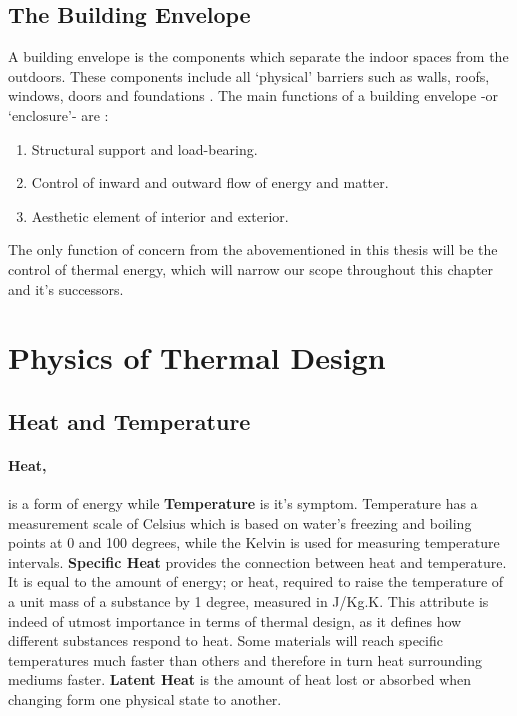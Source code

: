 \subsection{The Building Envelope}
A building envelope is the components which separate the indoor spaces from the outdoors. These components include all `physical' barriers such as walls, roofs, windows, doors and foundations \cite{HPO}. The main functions of a building envelope -or `enclosure'- are \cite{straube05}:
\begin{enumerate}
  \item Structural support and load-bearing.
  \item Control of inward and outward flow of energy and matter.
  \item Aesthetic element of interior and exterior.
\end{enumerate}
The only function of concern from the abovementioned in this thesis will be the control of thermal energy, which will narrow our scope throughout this chapter and it's successors.

\section{Physics of Thermal Design}

\subsection{Heat and Temperature}
\paragraph{Heat,}is a form of energy while \textbf{Temperature} is it's symptom. Temperature has a measurement scale of Celsius which is based on water's freezing and boiling points at 0 and 100 degrees, while the Kelvin is used for measuring temperature intervals. \textbf{Specific Heat} provides the connection between heat and temperature. It is equal to the amount of energy; or heat, required to raise the temperature of a unit mass of a substance by 1 degree, measured in J/Kg.K. This attribute is indeed of utmost importance in terms of thermal design, as it defines how different substances respond to heat. Some materials will reach specific temperatures much faster than others and therefore in turn heat surrounding mediums faster. \textbf{Latent Heat} is the amount of heat lost or absorbed when changing form one physical state to another.

